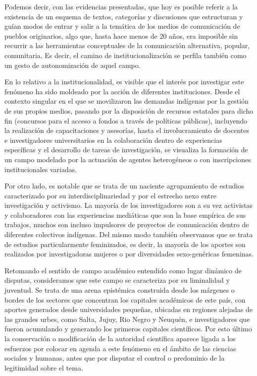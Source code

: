 \documentclass{tufte-handout}
\begin{document}
Podemos decir, con las evidencias presentadas, que hoy es posible
referir a la existencia de un esquema de textos, categorías y
discusiones que estructuran y guían modos de entrar y salir a la
temática de los medios de comunicación de pueblos originarios, algo que,
hasta hace menos de 20 años, era imposible sin recurrir a las
herramientas conceptuales de la comunicación alternativa, popular,
comunitaria. Es decir, el camino de institucionalización se perfila
también como un gesto de autonomización de aquel campo.

En lo relativo a la institucionalidad, es visible que el interés por
investigar este fenómeno ha sido moldeado por la acción de diferentes
instituciones. Desde el contexto singular en el que se movilizaron las
demandas indígenas por la gestión de sus propios medios, pasando por la
disposición de recursos estatales para dicho fin (concursos para el
acceso a fondos a través de políticas públicas), incluyendo la
realización de capacitaciones y asesorías, hasta el involucramiento de
docentes e investigadores universitarios en la colaboración dentro de
experiencias específicas y el desarrollo de tareas de investigación, se
visualiza la formación de un campo modelado por la actuación de agentes
heterogéneos o con inscripciones institucionales variadas.

\enlargethispage{\baselineskip}

Por otro lado, es notable que se trata de un naciente agrupamiento de
estudios caracterizado por su interdisciplinariedad y por el estrecho
nexo entre investigación y activismo. La mayoría de los investigadores
son a su vez activistas y colaboradores con las experiencias mediáticas
que son la base empírica de sus trabajos, muchos son incluso impulsores
de proyectos de comunicación dentro de diferentes colectivos indígenas.
Del mismo modo también observamos que se trata de estudios
particularmente feminizados, es decir, la mayoría de los aportes son
realizados por investigadoras mujeres o por diversidades sexo-genéricas
femeninas.

Retomando el sentido de campo académico entendido como lugar dinámico de
disputas, consideramos que este campo se caracteriza por su liminalidad
y juventud. Se trata de una arena epistémica construida desde los
márgenes o bordes de los sectores que concentran los capitales
académicos de este país, con aportes generados desde universidades
pequeñas, ubicadas en regiones alejadas de las grandes urbes, como
Salta, Jujuy, Rio Negro y Neuquén, e investigadores que fueron
acumulando y generando los primeros capitales científicos. Por esto
último la conservación o modificación de la autoridad científica aparece
ligada a los esfuerzos por colocar en agenda a este fenómeno en el
ámbito de las ciencias sociales y humanas, antes que por disputar el
control o predominio de la legitimidad sobre el tema.
\end{document}
